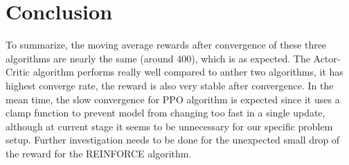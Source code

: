 \documentclass{article}
\begin{document}
\section{Conclusion}
\noindent To summarize, the moving average rewards after convergence of these 
three algorithms are nearly the same (around 400), which is as expected. 
The Actor-Critic algorithm performs really well compared to anther two 
algorithms, it has highest converge rate, the reward is also very stable after 
convergence. 
In the mean time, the slow convergence for PPO algorithm is expected since it 
uses a clamp function to prevent model from changing too fast in a single 
update, although at current stage it seems to be unnecessary for our specific 
problem setup. 
Further investigation needs to be done for the unexpected small drop of the 
reward for the REINFORCE algorithm.



\end{document}
